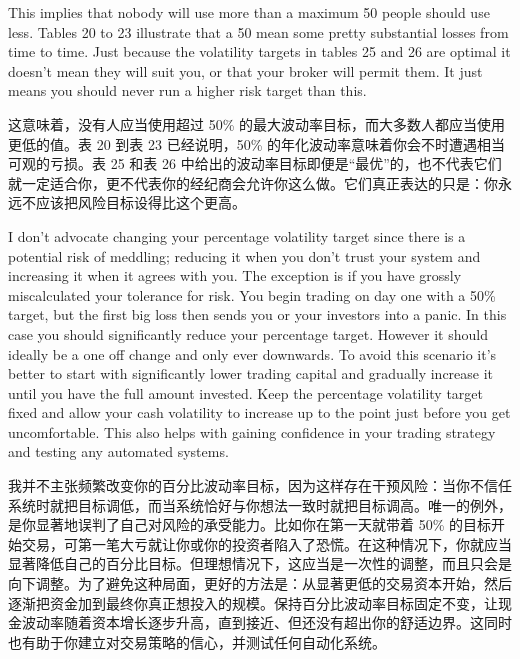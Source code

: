 \bipairgap

\begin{englishblock}
This implies that nobody will use more than a maximum 50%
people should use less. Tables 20 to 23 illustrate that a 50%
mean some pretty substantial losses from time to time. Just because the volatility targets in tables 25 and 26 are optimal it doesn’t mean they will suit you, or that your broker will permit them. It just means you should never run a higher risk target than this. \end{englishblock}

\begin{chineseblock}这意味着，没有人应当使用超过 50\% 的最大波动率目标，而大多数人都应当使用更低的值。表 20 到表 23 已经说明，50\% 的年化波动率意味着你会不时遭遇相当可观的亏损。表 25 和表 26 中给出的波动率目标即便是“最优”的，也不代表它们就一定适合你，更不代表你的经纪商会允许你这么做。它们真正表达的只是：你永远不应该把风险目标设得比这个更高。\end{chineseblock}


\begin{englishblock} I don’t advocate changing your percentage volatility target since there is a potential risk of meddling; reducing it when you don’t trust your system and increasing it when it agrees with you. The exception is if you have grossly miscalculated your tolerance for risk. You begin trading on day one with a 50\% target, but the first big loss then sends you or your investors into a panic. In this case you should significantly reduce your percentage target. However it should ideally be a one off change and only ever downwards. To avoid this scenario it’s better to start with significantly lower trading capital and gradually increase it until you have the full amount invested. Keep the percentage volatility target fixed and allow your cash volatility to increase up to the point just before you get uncomfortable. This also helps with gaining confidence in your trading strategy and testing any automated systems. \end{englishblock}

\begin{chineseblock}我并不主张频繁改变你的百分比波动率目标，因为这样存在干预风险：当你不信任系统时就把目标调低，而当系统恰好与你想法一致时就把目标调高。唯一的例外，是你显著地误判了自己对风险的承受能力。比如你在第一天就带着 50\% 的目标开始交易，可第一笔大亏就让你或你的投资者陷入了恐慌。在这种情况下，你就应当显著降低自己的百分比目标。但理想情况下，这应当是一次性的调整，而且只会是向下调整。为了避免这种局面，更好的方法是：从显著更低的交易资本开始，然后逐渐把资金加到最终你真正想投入的规模。保持百分比波动率目标固定不变，让现金波动率随着资本增长逐步升高，直到接近、但还没有超出你的舒适边界。这同时也有助于你建立对交易策略的信心，并测试任何自动化系统。\end{chineseblock}

